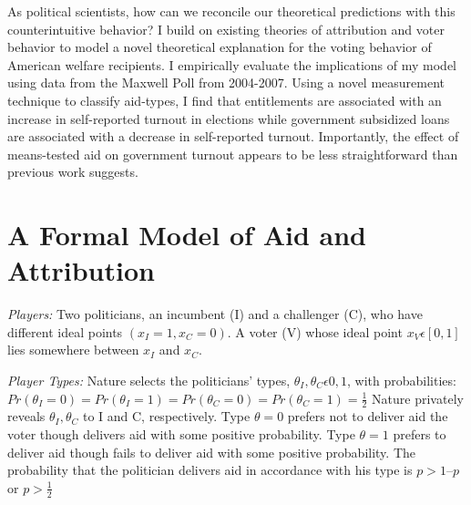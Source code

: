 \documentclass[12pt]{paper}
\begin{document}
As political scientists, how can we reconcile our theoretical predictions with this counterintuitive behavior? I build on existing theories of attribution and voter behavior to model a novel theoretical explanation for the voting behavior of American welfare recipients. I empirically evaluate the implications of my model using data from the Maxwell Poll from 2004-2007. Using a novel measurement technique to classify aid-types, I find that entitlements are associated with an increase in self-reported turnout in elections while government subsidized loans are associated with a decrease in self-reported turnout. Importantly, the effect of means-tested aid on government turnout appears to be less straightforward than previous work suggests.



\section{A Formal Model of Aid and Attribution}
\emph{Players:} Two politicians, an incumbent (I) and a challenger (C), who have different ideal points $(x_I=1, x_C=0)$. A voter (V) whose ideal point $x_V \epsilon [0,1]$ lies somewhere between $x_I$ and $x_C.$

\emph{Player Types:} Nature selects the politicians’ types, $\theta_I,\theta_C \epsilon {0,1}$, with probabilities: $Pr(\theta_I=0)=Pr(\theta_I=1)=Pr(\theta_C=0)=Pr(\theta_C=1)= \frac{1}{2}$ Nature privately reveals $\theta_I,\theta_C$ to I and C, respectively. Type $\theta=0$ prefers not to deliver aid the voter though delivers aid with some positive probability. Type $\theta=1$ prefers to deliver aid though fails to deliver aid with some positive probability. The probability that the politician delivers aid in accordance with his type is $p > 1 – p$ or $p > \frac{1}{2}$
\end{document}
